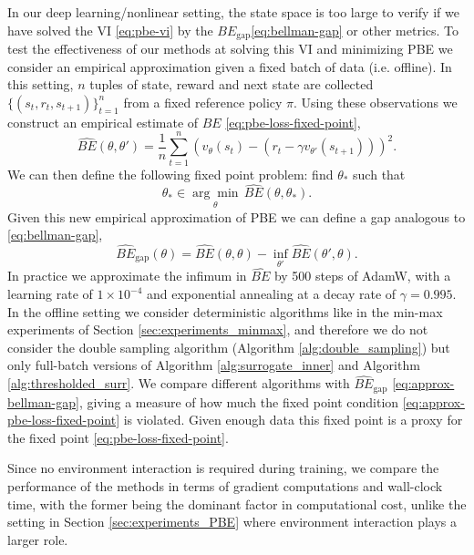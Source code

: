 \documentclass{article} %
\theoremstyle{definition}
\begin{document}
In our deep learning/nonlinear setting, the state space is too large to verify if we have solved the VI \eqref{eq:pbe-vi} by the $BE_{\text{gap}}$\eqref{eq:bellman-gap} or other metrics.
To test the effectiveness of our methods at solving this VI and minimizing PBE we consider an empirical approximation given a fixed batch of data (i.e. offline).
In this setting, $n$ tuples of state, reward and next state are collected $\{(s_t, r_t, s_{t+1})\}_{t=1}^n$ from a fixed reference policy $\pi$.
Using these observations we construct an empirical estimate of $BE$ \eqref{eq:pbe-loss-fixed-point},
\begin{equation}
    \widehat{BE}(\theta, \theta') = \frac{1}{n}\sum_{t=1}^n(v_{\theta}(s_t) - (r_t - \gamma v_{\theta'}(s_{t+1})))^2.
\end{equation}
We can then define the following fixed point problem:
find $\theta_{\ast}$ such that
\begin{equation}\label{eq:approx-pbe-loss-fixed-point}
    \theta_{\ast} \in \underset{\theta}{\arg\min} \, \widehat{BE}(\theta, \theta_\ast).
\end{equation}
Given this new empirical approximation of PBE we can define a gap analogous to \eqref{eq:bellman-gap}, 
\begin{equation}\label{eq:approx-bellman-gap}
    \widehat{BE}_{\text{gap}}(\theta) = \widehat{BE}(\theta, \theta) - \inf_{\theta'}\widehat{BE}(\theta', \theta).
\end{equation}
In practice we approximate the infimum in $\widehat{BE}$ by 500 steps of AdamW, with a learning rate of $1\times10^{-4}$ and exponential annealing at a decay rate of $\gamma = 0.995$.
In the offline setting we consider deterministic algorithms like in the min-max experiments of Section \ref{sec:experiments_minmax}, and therefore we do not  consider the double sampling algorithm (Algorithm \ref{alg:double_sampling}) but only full-batch versions of Algorithm \ref{alg:surrogate_inner} and Algorithm \ref{alg:thresholded_surr}.
We compare different algorithms with $\widehat{BE}_{\text{gap}}$ \eqref{eq:approx-bellman-gap}, giving a measure of how much the fixed point condition \eqref{eq:approx-pbe-loss-fixed-point} is violated. 
Given enough data this fixed point is a proxy for the fixed point \eqref{eq:pbe-loss-fixed-point}.

Since no environment interaction is required during training, we compare the performance of the methods in terms of gradient computations and wall-clock time, with the former being the dominant factor in computational cost, unlike the setting in Section \ref{sec:experiments_PBE} where environment interaction plays a larger role.
\end{document}
